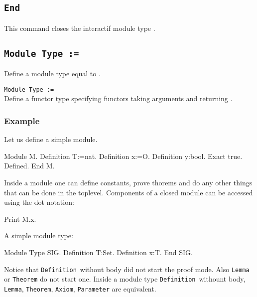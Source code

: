 \subsection{\tt End {\ident}}
This command closes the interactif module type {\ident}.

\begin{ErrMsgs}
\item {}
\end{ErrMsgs}

\subsection{\tt Module Type {\ident} := {\modtype}}
Define a module type \ident equal to \modtype.

\begin{Variants}
\item {\tt Module Type {\ident} {\modbindings} := {\modtype}} \\
  Define a functor type {\ident} specifying functors taking arguments
  {\modbindings} and returning {\modtype}.
\end{Variants}

\subsubsection{Example}

Let us define a simple module.
\begin{coq_example}
Module M.
  Definition T:=nat.
  Definition x:=O.
  Definition y:bool.
    Exact true.
  Defined.
End M.
\end{coq_example}
Inside a module one can define constants, prove thorems and do any
other things that can be done in the toplevel. Components of a closed
module can be accessed using the dot notation:
\begin{coq_example}
Print M.x.
\end{coq_example}
A simple module type:
\begin{coq_example}
Module Type SIG.
  Definition T:Set.
  Definition x:T.
End SIG.
\end{coq_example}
Notice that \texttt{Definition}\ without body did not start the proof
mode. Also \texttt{Lemma} or \texttt{Theorem} do not start one.
Inside a module type \texttt{Definition}\ withount body,
\texttt{Lemma}, \texttt{Theorem}, \texttt{Axiom}, \texttt{Parameter} are
equivalent.

